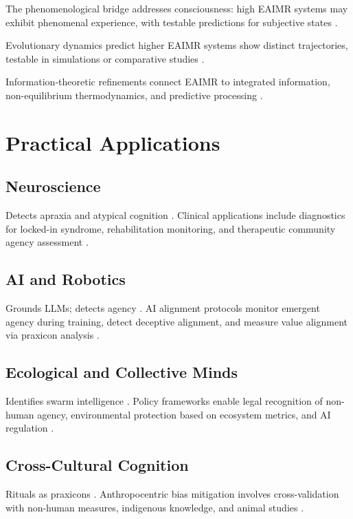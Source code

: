\documentclass{article}
\begin{document}
The phenomenological bridge addresses consciousness: high EAIMR systems may exhibit phenomenal experience, with testable predictions for subjective states \citep{tononi2004information}.

Evolutionary dynamics predict higher EAIMR systems show distinct trajectories, testable in simulations or comparative studies \citep{camazine2001self}.

Information-theoretic refinements connect EAIMR to integrated information, non-equilibrium thermodynamics, and predictive processing \citep{friston2010free}.

\section{Practical Applications}
\label{sec:applications}

\subsection{Neuroscience}
Detects apraxia and atypical cognition \citep{peigneux2004imaging, zeman2015}. Clinical applications include diagnostics for locked-in syndrome, rehabilitation monitoring, and therapeutic community agency assessment \citep{levin2022technological}.

\subsection{AI and Robotics}
Grounds LLMs; detects agency \citep{pastra2011praxicon, anderson2007how}. AI alignment protocols monitor emergent agency during training, detect deceptive alignment, and measure value alignment via praxicon analysis \citep{yudkowsky2008artificial}.

\subsection{Ecological and Collective Minds}
Identifies swarm intelligence \citep{camazine2001self, simondon2017mode}. Policy frameworks enable legal recognition of non-human agency, environmental protection based on ecosystem metrics, and AI regulation \citep{bostrom2014superintelligence}.

\subsection{Cross-Cultural Cognition}
Rituals as praxicons \citep{ortega1961meditations}. Anthropocentric bias mitigation involves cross-validation with non-human measures, indigenous knowledge, and animal studies \citep{kimmerer2013braiding}.
\end{document}
